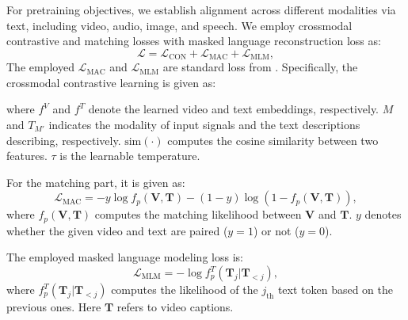 For pretraining objectives, we establish alignment across different modalities via text, including video, audio, image, and speech. We employ crossmodal contrastive and matching losses with masked language reconstruction loss as:
\begin{equation}
    \mathcal{L} = \mathcal{L}_\text{CON} + \mathcal{L}_\text{MAC} + \mathcal{L}_\text{MLM},
\end{equation}
The employed $\mathcal{L}_\text{MAC}$ and $\mathcal{L}_\text{MLM}$ are standard loss from \cite{Cheng2022VindLUAR}. Specifically, the crossmodal contrastive learning is given as:

\noindent{}
\label{eq:loss_contrastive}
where $f^{V}$ and $f^{T}$ denote the learned video and text embeddings, respectively. $M$ and $T_{M'}$ indicates the modality of input signals and the text descriptions describing, respectively.
$\text{sim}(\cdot)$ computes the cosine similarity between two features. $\tau$ is the learnable temperature.

For the matching part, it is given as:
\begin{equation}
    \mathcal{L}_{\text{MAC}} = - y \log f_p(\mathbf{V}, \mathbf{T}) - (1-y)\log (1-f_p(\mathbf{V}, \mathbf{T})),
\end{equation}
where $f_p(\mathbf{V}, \mathbf{T})$ computes the matching likelihood between $\mathbf{V}$ and $\mathbf{T}$. $y$ denotes whether the given video and text are paired ($y=1$) or not ($y=0$).

The employed masked language modeling loss is:
\begin{equation}
    \mathcal{L}_{\text{MLM}} = - \log f_p^T(\mathbf{T}_j|\mathbf{T}_{<j}),
\end{equation}
where $f_p^T(\mathbf{T}_j|\mathbf{T}_{<j})$ computes the likelihood of the $j_\text{th}$ text token based on the previous ones. Here $\mathbf{T}$ refers to video captions.

